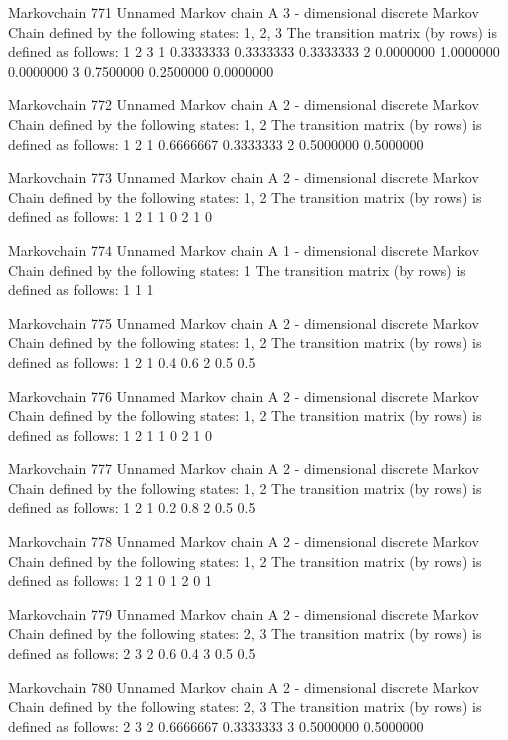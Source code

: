 \documentclass[
  nojss]{jss}
\begin{document}
\begin{CodeChunk}
\begin{CodeOutput}
Markovchain  771 
Unnamed Markov chain 
 A  3 - dimensional discrete Markov Chain defined by the following states: 
 1, 2, 3 
 The transition matrix  (by rows)  is defined as follows: 
          1         2         3
1 0.3333333 0.3333333 0.3333333
2 0.0000000 1.0000000 0.0000000
3 0.7500000 0.2500000 0.0000000

Markovchain  772 
Unnamed Markov chain 
 A  2 - dimensional discrete Markov Chain defined by the following states: 
 1, 2 
 The transition matrix  (by rows)  is defined as follows: 
          1         2
1 0.6666667 0.3333333
2 0.5000000 0.5000000

Markovchain  773 
Unnamed Markov chain 
 A  2 - dimensional discrete Markov Chain defined by the following states: 
 1, 2 
 The transition matrix  (by rows)  is defined as follows: 
  1 2
1 1 0
2 1 0

Markovchain  774 
Unnamed Markov chain 
 A  1 - dimensional discrete Markov Chain defined by the following states: 
 1 
 The transition matrix  (by rows)  is defined as follows: 
  1
1 1

Markovchain  775 
Unnamed Markov chain 
 A  2 - dimensional discrete Markov Chain defined by the following states: 
 1, 2 
 The transition matrix  (by rows)  is defined as follows: 
    1   2
1 0.4 0.6
2 0.5 0.5

Markovchain  776 
Unnamed Markov chain 
 A  2 - dimensional discrete Markov Chain defined by the following states: 
 1, 2 
 The transition matrix  (by rows)  is defined as follows: 
  1 2
1 1 0
2 1 0

Markovchain  777 
Unnamed Markov chain 
 A  2 - dimensional discrete Markov Chain defined by the following states: 
 1, 2 
 The transition matrix  (by rows)  is defined as follows: 
    1   2
1 0.2 0.8
2 0.5 0.5

Markovchain  778 
Unnamed Markov chain 
 A  2 - dimensional discrete Markov Chain defined by the following states: 
 1, 2 
 The transition matrix  (by rows)  is defined as follows: 
  1 2
1 0 1
2 0 1

Markovchain  779 
Unnamed Markov chain 
 A  2 - dimensional discrete Markov Chain defined by the following states: 
 2, 3 
 The transition matrix  (by rows)  is defined as follows: 
    2   3
2 0.6 0.4
3 0.5 0.5

Markovchain  780 
Unnamed Markov chain 
 A  2 - dimensional discrete Markov Chain defined by the following states: 
 2, 3 
 The transition matrix  (by rows)  is defined as follows: 
          2         3
2 0.6666667 0.3333333
3 0.5000000 0.5000000


\end{CodeOutput}
\end{CodeChunk}
\end{document}
